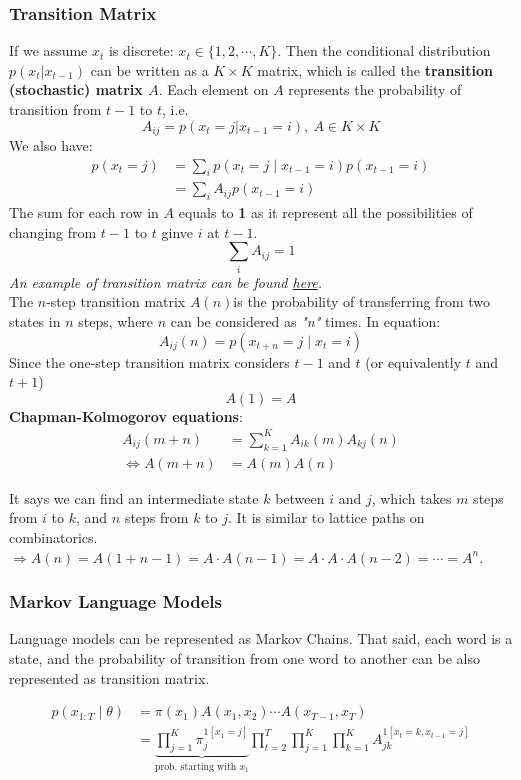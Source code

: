 \subsubsection*{Transition Matrix}
If we assume $x_t$ is discrete: $x_t\in\{1,2,\cdots,K\}$. Then the conditional distribution $p(x_t|x_{t-1})$ can be written as a $K\times K$ matrix, which is called the \textbf{transition (stochastic) matrix $A$}. Each element on $A$ represents the probability of transition from $t-1$ to $t$, i.e.
$$A_{ij}=p(x_t=j|x_{t-1}=i),\:A\in K\times K$$
We also have:
\begin{align*} 
    p\left(x_t=j\right) & =\sum_i p\left(x_t=j \mid x_{t-1}=i\right) p\left(x_{t-1}=i\right) \\ 
    & =\sum_i A_{i j} p\left(x_{t-1}=i\right)
\end{align*}
The sum for each row in $A$ equals to \textbf{1} as it represent all the possibilities of changing from $t-1$ to $t$ ginve $i$ at $t-1$.
$$\sum_i A_{i j}=1$$
\textit{An example of transition matrix can be found \hyperref[fig:transition-example]{here}.}\\
The $n$-step transition matrix $A(n)$is the probability of transferring from two states in $n$ steps, where $n$ can be considered as \textit{"n"} times. In equation:
$$
A_{i j}(n)=p\left(x_{t+n}=j \mid x_t=i\right)
$$
Since the one-step transition matrix considers $t-1$ and $t$ (or equivalently $t$ and $t+1$)
$$A(1)=A$$
\textbf{Chapman-Kolmogorov equations}:
\begin{align*}
    A_{i j}(m+n)&=\sum_{k=1}^K A_{i k}(m) A_{k j}(n)\\
    \Leftrightarrow A(m+n)&=A(m) A(n)
\end{align*}

It says we can find an intermediate state $k$ between $i$ and $j$, which takes $m$ steps from $i$ to $k$, and $n$ steps from $k$ to $j$. It is similar to lattice paths on combinatorics.\\
$\Rightarrow A(n)=A(1+n-1)=A \cdot A(n-1)=A \cdot A \cdot A(n-2)=\cdots=A^n$.

\subsubsection*{Markov Language Models}
Language models can be represented as Markov Chains. That said, each word is a state, and the probability of transition from one word to another can be also represented as transition matrix.

\begin{align*} 
    p\left(x_{1: T} \mid \theta\right) & =\pi\left(x_1\right) A\left(x_1, x_2\right) \cdots A\left(x_{T-1}, x_T\right) \\
    & =\underbrace{\prod_{j=1}^K \pi_j^{1\left[x_1=j\right]}}_{\text{prob. starting with }x_1} \prod_{t=2}^T \prod_{j=1}^K \prod_{k=1}^K A_{j k}^{1\left[x_t=k, x_{t-1}=j\right]}
\end{align*}

